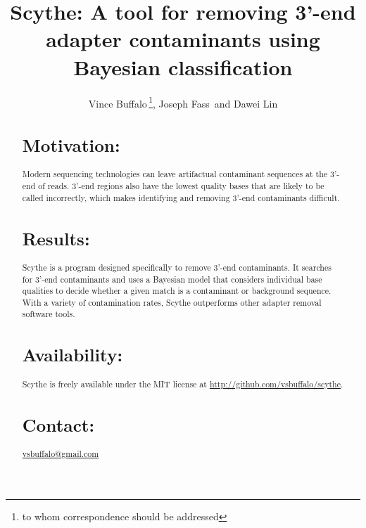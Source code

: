\documentclass{bioinfo}
\begin{document}

\title[Scythe]{Scythe: A tool for removing 3'-end adapter contaminants using Bayesian classification}
\author[Buffalo \textit{et~al}]{Vince Buffalo\,\footnote{to whom correspondence should be addressed}, Joseph Fass\, and Dawei Lin}
\address{Bioinformatics Core, UC Davis Genome Center}



\maketitle

\begin{abstract}

\section{Motivation:}
Modern sequencing technologies can leave artifactual contaminant
sequences at the 3'-end of reads. 3'-end regions also have the lowest
quality bases that are likely to be called incorrectly, which makes
identifying and removing 3'-end contaminants difficult. 

\section{Results:} 
Scythe is a program designed specifically to remove 3'-end
contaminants. It searches for 3'-end contaminants and uses a Bayesian
model that considers individual base qualities to decide whether a
given match is a contaminant or background sequence. With a variety of
contamination rates, Scythe outperforms other adapter removal software
tools.

\section{Availability:}
Scythe is freely available under the MIT license at
\href{http://github.com/vsbuffalo/scythe}{http://github.com/vsbuffalo/scythe}.

\section{Contact:} \href{mailto:vsbuffalo@gmail.com}{vsbuffalo@gmail.com}
\end{abstract}
\end{document}
